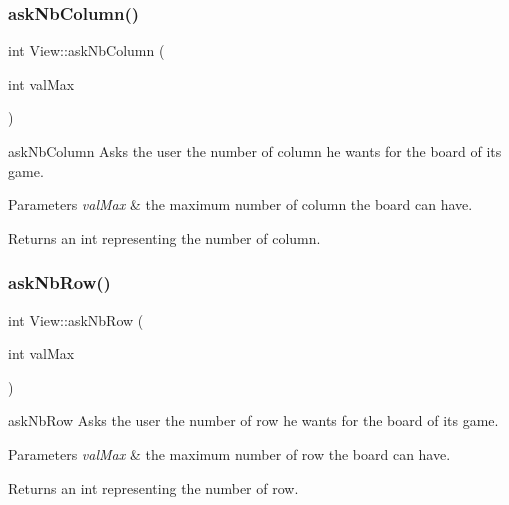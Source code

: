 \subsubsection{\texorpdfstring{ask\+Nb\+Column()}{askNbColumn()}}
{\footnotesize\ttfamily int View\+::ask\+Nb\+Column (\begin{DoxyParamCaption}\item[{int}]{val\+Max }\end{DoxyParamCaption})}



ask\+Nb\+Column Asks the user the number of column he wants for the board of its game. 


\begin{DoxyParams}{Parameters}
{\em val\+Max} & the maximum number of column the board can have. \\
\hline
\end{DoxyParams}
\begin{DoxyReturn}{Returns}
an int representing the number of column. 
\end{DoxyReturn}
\mbox{\label{class_view_acbe5ecf3c0bdcd0971ba65fb8192ac6d}} 
\subsubsection{\texorpdfstring{ask\+Nb\+Row()}{askNbRow()}}
{\footnotesize\ttfamily int View\+::ask\+Nb\+Row (\begin{DoxyParamCaption}\item[{int}]{val\+Max }\end{DoxyParamCaption})}



ask\+Nb\+Row Asks the user the number of row he wants for the board of its game. 


\begin{DoxyParams}{Parameters}
{\em val\+Max} & the maximum number of row the board can have. \\
\hline
\end{DoxyParams}
\begin{DoxyReturn}{Returns}
an int representing the number of row. 
\end{DoxyReturn}
\mbox{\label{class_view_ae372864497e82f1abe7a3fc916af0d52}} 
